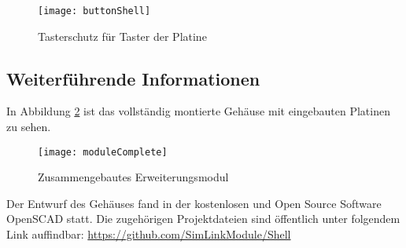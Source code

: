 \begin{figure}[h]
    \centering
    \texttt{[image: buttonShell]}
    \caption{Tasterschutz für Taster der Platine}
    \label{fig:buttonShell}
\end{figure}

\subsection{Weiterführende Informationen}
In Abbildung \ref{fig:moduleComplete} ist das vollständig montierte Gehäuse mit eingebauten Platinen zu sehen.

\begin{figure}[h]
    \centering
    \texttt{[image: moduleComplete]}
    \caption{Zusammengebautes Erweiterungsmodul}
    \label{fig:moduleComplete}
\end{figure}

Der Entwurf des Gehäuses fand in der kostenlosen und Open Source Software OpenSCAD \cite{aboutOpenScad} statt. Die zugehörigen Projektdateien sind öffentlich unter folgendem Link auffindbar: \url{https://github.com/SimLinkModule/Shell}